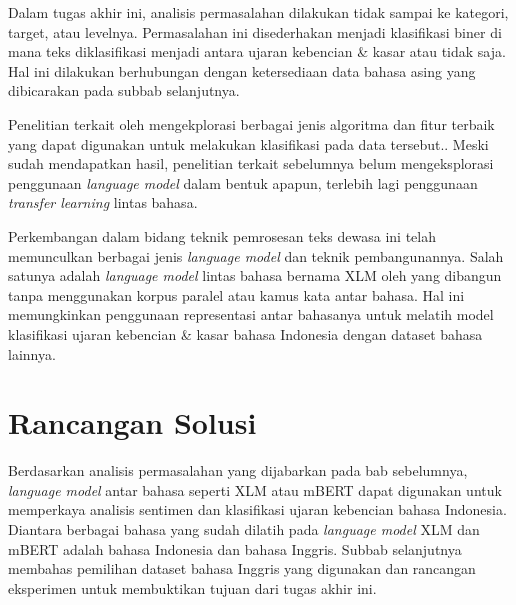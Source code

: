 	Dalam tugas akhir ini, analisis permasalahan dilakukan tidak sampai ke kategori, target, atau levelnya. Permasalahan ini disederhakan menjadi klasifikasi biner di mana teks diklasifikasi menjadi antara ujaran kebencian \& kasar atau tidak saja. Hal ini dilakukan berhubungan dengan ketersediaan data bahasa asing yang dibicarakan pada subbab selanjutnya.

	Penelitian terkait oleh \parencite{Ibrohim_Budi_2019} mengekplorasi berbagai jenis algoritma dan fitur terbaik yang dapat digunakan untuk melakukan klasifikasi pada data tersebut.. Meski sudah mendapatkan hasil, penelitian terkait sebelumnya belum mengeksplorasi penggunaan \textit{language model} dalam bentuk apapun, terlebih lagi penggunaan \textit{transfer learning} lintas bahasa.

	Perkembangan dalam bidang teknik pemrosesan teks dewasa ini telah memunculkan berbagai jenis \textit{language model} dan teknik pembangunannya. Salah satunya adalah \textit{language model} lintas bahasa bernama XLM oleh \parencite{LampleConneau2019} yang dibangun tanpa menggunakan korpus paralel atau kamus kata antar bahasa. Hal ini memungkinkan penggunaan representasi antar bahasanya untuk melatih model klasifikasi ujaran kebencian \& kasar bahasa Indonesia dengan dataset bahasa lainnya.






\section{Rancangan Solusi}
	Berdasarkan analisis permasalahan yang dijabarkan pada bab sebelumnya, \textit{language model} antar bahasa seperti XLM atau mBERT dapat digunakan untuk memperkaya analisis sentimen dan klasifikasi ujaran kebencian bahasa Indonesia. Diantara berbagai bahasa yang sudah dilatih pada \textit{language model} XLM dan mBERT adalah bahasa Indonesia dan bahasa Inggris. Subbab selanjutnya membahas pemilihan dataset bahasa Inggris yang digunakan dan rancangan eksperimen untuk membuktikan tujuan dari tugas akhir ini.

